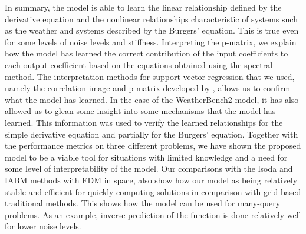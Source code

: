 In summary, the model is able to learn the linear relationship defined by the derivative equation and the nonlinear relationships characteristic of systems such as the weather and systems described by the Burgers' equation. This is true even for some levels of noise levels and stiffness. Interpreting the p-matrix, we explain how the model has learned the correct contribution of the input coefficients to each output coefficient based on the equations obtained using the spectral method. The interpretation methods for support vector regression that we used, namely the correlation image and p-matrix developed by \textcite{ustunVisualisationInterpretationSupport2007}, allows us to confirm what the model has learned. In the case of the WeatherBench2 model, it has also allowed us to glean some insight into some mechanisms that the model has learned. This information was used to verify the learned relationships for the simple derivative equation and partially for the Burgers' equation. Together with the performance metrics on three different problems, we have shown the proposed model to be a viable tool for situations with limited knowledge and a need for some level of interpretability of the model. Our comparisons with the lsoda and IABM methods with FDM in space, also show how our model as being relatively stable and efficient for quickly computing solutions in comparison with grid-based traditional methods. This shows how the model can be used for many-query problems. As an example, inverse prediction of the function is done relatively well for lower noise levels.